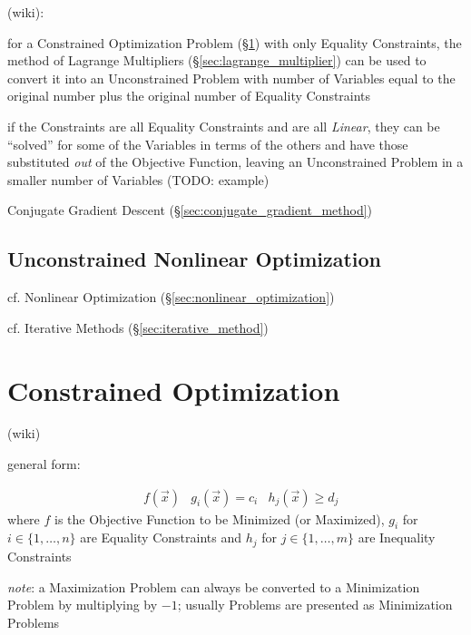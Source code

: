 (wiki):

for a Constrained Optimization Problem (\S\ref{sec:constrained_optimization})
with only Equality Constraints, the method of Lagrange Multipliers
(\S\ref{sec:lagrange_multiplier}) can be used to convert it into an
Unconstrained Problem with number of Variables equal to the original number
plus the original number of Equality Constraints

if the Constraints are all Equality Constraints and are all \emph{Linear}, they
can be ``solved'' for some of the Variables in terms of the others and have
those substituted \emph{out} of the Objective Function, leaving an
Unconstrained Problem in a smaller number of Variables (TODO: example)

Conjugate Gradient Descent (\S\ref{sec:conjugate_gradient_method})



\subsection{Unconstrained Nonlinear Optimization}
\label{sec:unconstrained_nonlinear}

\fist cf. Nonlinear Optimization (\S\ref{sec:nonlinear_optimization})

\fist cf. Iterative Methods (\S\ref{sec:iterative_method})



\section{Constrained Optimization}\label{sec:constrained_optimization}

(wiki)

general form:

\begin{align*}
  & f(\vec{x})
  & g_i(\vec{x}) = c_i
  & h_j(\vec{x}) \geq d_j
\end{align*}
where $f$ is the Objective Function to be Minimized (or Maximized), $g_i$ for
$i \in \{ 1, \ldots, n \}$ are Equality Constraints and $h_j$ for $j \in \{ 1,
\ldots, m \}$ are Inequality Constraints

\emph{note}: a Maximization Problem can always be converted to a Minimization
Problem by multiplying by $-1$; usually Problems are presented as Minimization
Problems

